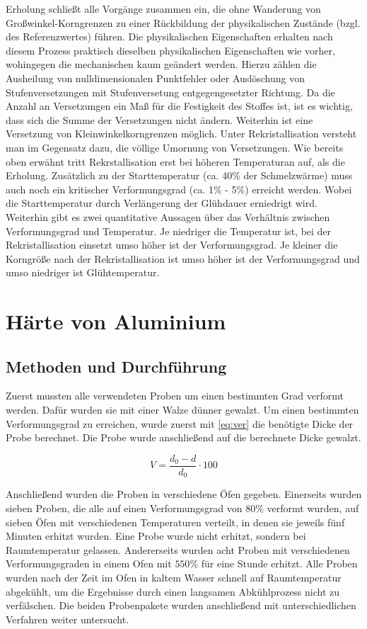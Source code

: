 \documentclass[
	a4paper,
	12pt,
	pagesize,
	ngerman
]{scrartcl}
\begin{document}
Erholung schließt alle Vorgänge zusammen ein, die ohne Wanderung von Großwinkel-Korngrenzen zu einer Rückbildung der physikalischen Zustände (bzgl. des Referenzwertes) führen.
Die physikalischen Eigenschaften erhalten nach diesem Prozess praktisch dieselben physikalischen Eigenschaften wie vorher, wohingegen die mechanischen kaum geändert werden. Hierzu zählen die Ausheilung von nulldimensionalen Punktfehler oder Auslöschung von  Stufenversetzungen mit Stufenversetung entgegengesetzter Richtung. Da die Anzahl an Versetzungen ein Maß für die Festigkeit des Stoffes ist, ist es wichtig, dass sich die Summe der Versetzungen nicht ändern. Weiterhin ist eine Versetzung von Kleinwinkelkorngrenzen möglich. 
Unter Rekristallisation versteht man im Gegensatz dazu, die völlige Umornung von Versetzungen.
Wie bereits oben erwähnt tritt Rekrstallisation erst bei höheren Temperaturan auf, als die Erholung. Zusätzlich zu der Starttemperatur (ca. 40\% der Schmelzwärme) muss auch noch ein kritischer Verformungsgrad (ca. 1\% - 5\%) erreicht werden. Wobei die Starttemperatur durch Verlängerung der Glühdauer erniedrigt wird. Weiterhin gibt es zwei quantitative Aussagen über das Verhältnis zwischen Verformungsgrad und Temperatur.
Je niedriger die Temperatur ist, bei der Rekristallisation einsetzt umso höher ist der Verformungsgrad.  
Je kleiner die Korngröße nach der Rekristallisation ist umso höher ist der Verformungsgrad und umso niedriger ist Glühtemperatur.  
 


\section{Härte von Aluminium}
\subsection{Methoden und Durchführung}
Zuerst mussten alle verwendeten Proben um einen bestimmten Grad verformt werden. Dafür wurden sie mit einer Walze dünner gewalzt. Um einen bestimmten Verformungsgrad zu erreichen, wurde zuerst mit \cref{eq:ver} die benötigte Dicke der Probe berechnet. Die Probe wurde anschließend auf die berechnete Dicke gewalzt.

\begin{equation}
V = \frac{d_0-d}{d_0} \cdot 100
\label{eq:ver}
\end{equation}

Anschließend wurden die Proben in verschiedene Öfen gegeben. Einerseits wurden sieben Proben, die alle auf einen Verformungsgrad von $80\%$ verformt wurden, auf sieben Öfen mit verschiedenen Temperaturen verteilt, in denen sie jeweils fünf Minuten erhitzt wurden. Eine Probe wurde nicht erhitzt, sondern bei Raumtemperatur gelassen. Andererseits wurden acht Proben mit verschiedenen Verformungsgraden in einem Ofen mit $550\%$ für eine Stunde erhitzt. Alle Proben wurden nach der Zeit im Ofen in kaltem Wasser schnell auf Raumtemperatur abgekühlt, um die Ergebnisse durch einen langsamen Abkühlprozess nicht zu verfälschen. Die beiden Probenpakete wurden anschließend mit unterschiedlichen Verfahren weiter untersucht.
\end{document}

